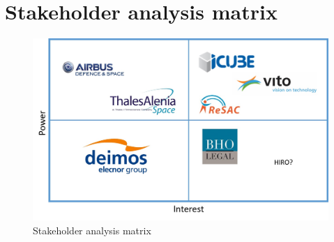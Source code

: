 \section{Stakeholder analysis matrix}
\begin{figure}[H]
\centering
\includegraphics[width=\textwidth]{././images/identitymatrix2.jpg} 
\caption{Stakeholder analysis matrix}
\end{figure}
